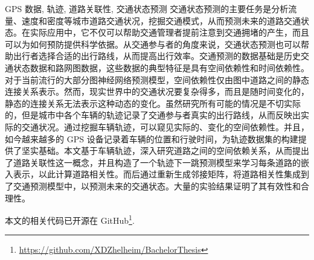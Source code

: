\begin{中文摘要}{GPS 数据, 轨迹, 道路关联性, 交通状态预测}
  交通状态预测的主要任务是分析流量、速度和密度等城市道路交通状况，挖掘交通模式，从而预测未来的道路交通状态。在实际应用中，它不仅可以帮助交通管理者提前注意到交通拥堵的产生，而且可以为如何预防提供科学依据。从交通参与者的角度来说，交通状态预测也可以帮助出行者选择合适的出行路线，从而提高出行效率。交通预测的数据基础是历史交通状态数据和路网图数据，这些数据的典型特征是具有空间依赖性和时间依赖性。对于当前流行的大部分图神经网络预测模型，空间依赖性仅由图中道路之间的静态连接关系表示。然而，现实世界中的交通状况要复杂得多，而且是随时间变化的，静态的连接关系无法表示这种动态的变化。虽然研究所有可能的情况是不切实际的，但是城市中各个车辆的轨迹记录了交通参与者真实的出行路线，从而反映出实际的交通状况。通过挖掘车辆轨迹，可以窥见实际的、变化的空间依赖性。并且，如今越来越多的 GPS 设备记录着车辆的位置和行驶时间，为轨迹数据集的构建提供了坚实基础。本文基于车辆轨迹，深入研究道路之间的空间依赖关系，从而提出了道路关联性这一概念，并且构造了一个轨迹下一跳预测模型来学习每条道路的嵌入表示，以此计算道路相关性。而后通过重新生成邻接矩阵，将道路相关性集成到了交通预测模型中，以预测未来的交通状态。大量的实验结果证明了其有效性和合理性。

  本文的相关代码已开源在 GitHub\footnote{\href{https://github.com/XDZhelheim/BachelorThesis}{https://github.com/XDZhelheim/BachelorThesis}}.
\end{中文摘要}

